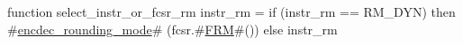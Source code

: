function  select_instr_or_fcsr_rm   instr_rm =
  if   (instr_rm == RM_DYN)
  then #\hyperref[sailRISCVzencdeczyroundingzymode]{encdec\_rounding\_mode}# (fcsr.#\hyperref[sailRISCVzFRM]{FRM}#())
  else instr_rm
